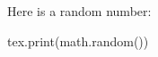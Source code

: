 \documentclass{article}
\begin{document}
Here is a random number:
\begin{luacode}
tex.print(math.random())
\end{luacode}
\end{document}
